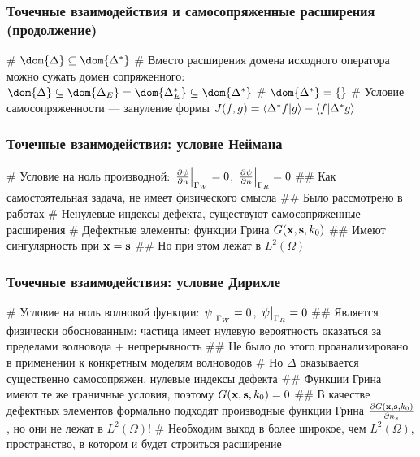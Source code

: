 \documentclass{beamer}
\begin{document}
\begin{frame}[fragile]
\frametitle{Точечные взаимодействия и самосопряженные расширения (продолжение)}
\begin{easylist}[itemize]
# $\dom{\Delta} \subseteq \dom{\Delta^*}$
# Вместо расширения домена исходного оператора можно сужать домен сопряженного: $\dom{\Delta} \subseteq \dom{\Delta_E} = \dom{\Delta_E^*} \subseteq \dom{\Delta^*}$
# $\dom{\Delta^*} = \{ \}$ 
# Условие самосопряженности — зануление формы $J(f, g) = \ip{\Delta^* f}{g} - \ip{f}{\Delta^* g}$
\end{easylist}
\end{frame}



\begin{frame}[fragile]
\frametitle{Точечные взаимодействия: условие Неймана}
\begin{easylist}[itemize]
# Условие на ноль производной: $\eval{\pdv{\psi}{n}}_{\Gamma_W} = 0$, $\eval{\pdv{\psi}{n}}_{\Gamma_R} = 0$
## Как самостоятельная задача, не имеет физического смысла
## Было рассмотрено в работах 
# Ненулевые индексы дефекта, существуют самосопряженные расширения
# Дефектные элементы: функции Грина $G(\vb{x}, \vb{s}, k_0)$
## Имеют сингулярность при $\vb{x} = \vb{s}$
## Но при этом лежат в $L^2(\Omega)$
\end{easylist}
\end{frame}

\begin{frame}[fragile]
\frametitle{Точечные взаимодействия: условие Дирихле}
\begin{easylist}[itemize]
# Условие на ноль волновой функции: $\eval{\psi}_{\Gamma_W} = 0$, $\eval{\psi}_{\Gamma_R} = 0$
## Является физически обоснованным: частица имеет нулевую вероятность оказаться за пределами волновода + непрерывность
## Не было до этого проанализировано в применении к конкретным моделям волноводов
# Но $\Delta$ оказывается существенно самосопряжен, нулевые индексы дефекта
## Функции Грина имеют те же граничные условия, поэтому $G(\vb{x}, \vb{s}, k_0) = 0$
## В качестве дефектных элементов формально подходят производные функции Грина $\pdv{G(\vb{x}, \vb{s}, k_0)}{n_s}$, но они не лежат в $L^2(\Omega)$!
# Необходим выход в более широкое, чем $L^2(\Omega)$, пространство, в котором и будет строиться расширение
\end{easylist}
\end{frame}
\end{document}
